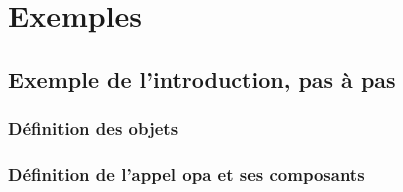 \documentclass[a4paper,11pt]{report}
\newcommand{\inputTikZ}[1]{%
  }%
\newcommand{\inputTikZ}[1]{%
    \texttt{[image: fig/\#1.pdf]}%
  }%
\begin{document}
\medskip

\begin{minipage}{0.6\textwidth}

\end{minipage}
\begin{minipage}{0.4\textwidth}
\begin{center}
\inputTikZ{createcallset}
\end{center}
\end{minipage}

\section{Exemples}

\subsection{Exemple de l'introduction, pas à pas}

\subsubsection{Définition des objets}

{\color{red!70!black}
\vspace{-0.4cm}

}

\begin{center}
\inputTikZ{seqdiagstep1}
\end{center}

\subsubsection{Définition de l'appel opa et ses composants}

\vspace{-0.4cm}
{\color{red!70!black}
\vspace{-0.4cm}
\vspace{-0.4cm}
\vspace{-0.4cm}
\vspace{-0.4cm}
\vspace{-0.4cm}
\vspace{-0.4cm}
\vspace{-0.4cm}
\vspace{-0.4cm}
\vspace{-0.4cm}
}

\end{document}

